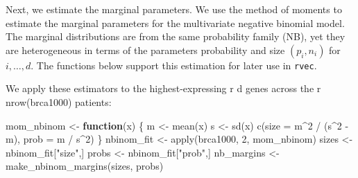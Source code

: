 \documentclass{article}
\newenvironment{Shaded}{\begin{snugshade}}{\end{snugshade}}
\newcommand{\AttributeTok}[1]{\textcolor[rgb]{0.77,0.63,0.00}{#1}}
\newcommand{\CommentTok}[1]{\textcolor[rgb]{0.56,0.35,0.01}{\textit{#1}}}
\newcommand{\ControlFlowTok}[1]{\textcolor[rgb]{0.13,0.29,0.53}{\textbf{#1}}}
\newcommand{\DecValTok}[1]{\textcolor[rgb]{0.00,0.00,0.81}{#1}}
\newcommand{\FunctionTok}[1]{\textcolor[rgb]{0.00,0.00,0.00}{#1}}
\newcommand{\NormalTok}[1]{#1}
\newcommand{\OtherTok}[1]{\textcolor[rgb]{0.56,0.35,0.01}{#1}}
\newcommand{\SpecialCharTok}[1]{\textcolor[rgb]{0.00,0.00,0.00}{#1}}
\newcommand{\StringTok}[1]{\textcolor[rgb]{0.31,0.60,0.02}{#1}}
\begin{document}
\begin{Shaded}
\end{Shaded}

Next, we estimate the marginal parameters. We use the method of moments
to estimate the marginal parameters for the multivariate negative
binomial model. The marginal distributions are from the same probability
family (NB), yet they are heterogeneous in terms of the parameters
probability and size \((p_i, n_i)\) for \(i,\ldots,d\). The functions
below support this estimation for later use in \texttt{rvec}.

\begin{Shaded}
\end{Shaded}

We apply these estimators to the highest-expressing r d genes across the
r nrow(brca1000) patients:

\begin{Shaded}
\begin{Highlighting}[]
\NormalTok{mom\_nbinom }\OtherTok{\textless{}{-}} \ControlFlowTok{function}\NormalTok{(x) \{}
\NormalTok{  m }\OtherTok{\textless{}{-}} \FunctionTok{mean}\NormalTok{(x)}
\NormalTok{  s }\OtherTok{\textless{}{-}} \FunctionTok{sd}\NormalTok{(x)}
  \FunctionTok{c}\NormalTok{(}\AttributeTok{size =}\NormalTok{ m}\SpecialCharTok{\^{}}\DecValTok{2} \SpecialCharTok{/}\NormalTok{ (s}\SpecialCharTok{\^{}}\DecValTok{2} \SpecialCharTok{{-}}\NormalTok{ m), }\AttributeTok{prob =}\NormalTok{ m }\SpecialCharTok{/}\NormalTok{ s}\SpecialCharTok{\^{}}\DecValTok{2}\NormalTok{)}
\NormalTok{\}}
\NormalTok{nbinom\_fit }\OtherTok{\textless{}{-}} \FunctionTok{apply}\NormalTok{(brca1000, }\DecValTok{2}\NormalTok{, mom\_nbinom)}
\NormalTok{sizes }\OtherTok{\textless{}{-}}\NormalTok{ nbinom\_fit[}\StringTok{"size"}\NormalTok{,]}
\NormalTok{probs }\OtherTok{\textless{}{-}}\NormalTok{ nbinom\_fit[}\StringTok{"prob"}\NormalTok{,]}
\NormalTok{nb\_margins }\OtherTok{\textless{}{-}} \FunctionTok{make\_nbinom\_margins}\NormalTok{(sizes, probs)}
\end{Highlighting}
\end{Shaded}
\end{document}
